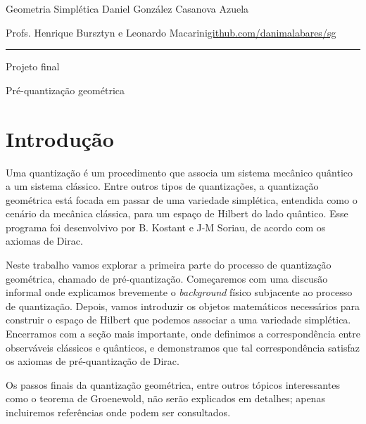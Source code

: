 
\usepackage[style=authortitle-terse,backend=bibtex]{biblatex}




\begin{minipage}{\textwidth}
	\begin{minipage}{1\textwidth}
		Geometria Simplética \hfill Daniel González Casanova Azuela
		
		{\small Profs. Henrique Bursztyn e Leonardo Macarini\hfill\href{https://github.com/danimalabares/sg}{github.com/danimalabares/sg}}
	\end{minipage}
\end{minipage}\vspace{.2cm}\hrule

\vspace{10pt}
{\large Projeto final}

{\huge Pré-quantização geométrica}

\tableofcontents

\section{Introdução}

Uma quantização é um procedimento que associa um sistema mecânico quântico a um sistema clássico. Entre outros tipos de quantizações, a quantização geométrica está focada em passar de uma variedade simplética, entendida como o cenário da mecânica clássica, para um espaço de Hilbert do lado quântico. Esse programa foi desenvolvivo por B. Kostant e J-M Soriau, de acordo com os axiomas de Dirac.

Neste trabalho vamos explorar a primeira parte do processo de quantização geométrica, chamado de pré-quantização. Começaremos com uma discusão informal onde explicamos brevemente o \textit{background} físico subjacente ao processo de quantização. Depois, vamos introduzir os objetos matemáticos necessários para construir o espaço de Hilbert que podemos associar a uma variedade simplética. Encerramos com a seção mais importante, onde definimos a correspondência entre observáveis clássicos e quânticos, e demonstramos que tal correspondência satisfaz os axiomas de pré-quantização de Dirac.

Os passos finais da quantização geométrica, entre outros tópicos interessantes como o teorema de Groenewold, não serão explicados em detalhes; apenas incluiremos referências onde podem ser consultados.

